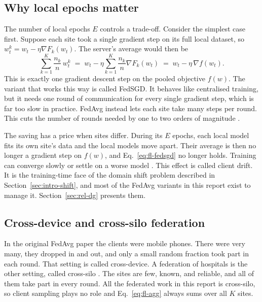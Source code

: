 \subsection{Why local epochs matter}

The number of local epochs $E$ controls a trade-off. Consider the simplest case first. Suppose each site took a single gradient step on its full local dataset, so $w_t^{k} = w_t - \eta \nabla F_k(w_t)$. The server's average would then be
\begin{equation}
\label{eq:fl-fedsgd}
\sum_{k=1}^{K} \frac{n_k}{n} \, w_t^{k}
\;=\; w_t - \eta \sum_{k=1}^{K} \frac{n_k}{n} \nabla F_k(w_t)
\;=\; w_t - \eta \, \nabla f(w_t).
\end{equation}
This is exactly one gradient descent step on the pooled objective $f(w)$. The variant that works this way is called FedSGD. It behaves like centralised training, but it needs one round of communication for every single gradient step, which is far too slow in practice. FedAvg instead lets each site take many steps per round. This cuts the number of rounds needed by one to two orders of magnitude \citep{mcmahan2017fedavg}.

The saving has a price when sites differ. During its $E$ epochs, each local model fits its own site's data and the local models move apart. Their average is then no longer a gradient step on $f(w)$, and Eq.~\ref{eq:fl-fedsgd} no longer holds. Training can converge slowly or settle on a worse model \citep{li2020fedprox}. This effect is called client drift. It is the training-time face of the domain shift problem described in Section~\ref{sec:intro-shift}, and most of the FedAvg variants in this report exist to manage it. Section~\ref{sec:rel-dg} presents them.

\subsection{Cross-device and cross-silo federation}

In the original FedAvg paper the clients were mobile phones. There were very many, they dropped in and out, and only a small random fraction took part in each round. That setting is called cross-device. A federation of hospitals is the other setting, called cross-silo \citep{kairouz2021advances}. The sites are few, known, and reliable, and all of them take part in every round. All the federated work in this report is cross-silo, so client sampling plays no role and Eq.~\ref{eq:fl-agg} always sums over all $K$ sites.

